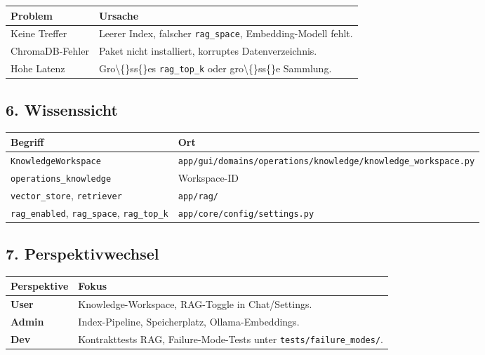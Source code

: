 \begin{center}
\begin{tabular}{ll}
\hline
Problem & Ursache \\
\hline
Keine Treffer & Leerer Index, falscher \texttt{rag\_space}, Embedding-Modell fehlt. \\
ChromaDB-Fehler & Paket nicht installiert, korruptes Datenverzeichnis. \\
Hohe Latenz & Gro\textbackslash\{\}ss\{\}es \texttt{rag\_top\_k} oder gro\textbackslash\{\}ss\{\}e Sammlung. \\
\hline
\end{tabular}
\end{center}

\subsection{6. Wissenssicht}

\begin{center}
\begin{tabular}{ll}
\hline
Begriff & Ort \\
\hline
\texttt{KnowledgeWorkspace} & \texttt{app/gui/domains/operations/knowledge/knowledge\_workspace.py} \\
\texttt{operations\_knowledge} & Workspace-ID \\
\texttt{vector\_store}, \texttt{retriever} & \texttt{app/rag/} \\
\texttt{rag\_enabled}, \texttt{rag\_space}, \texttt{rag\_top\_k} & \texttt{app/core/config/settings.py} \\
\hline
\end{tabular}
\end{center}

\subsection{7. Perspektivwechsel}

\begin{center}
\begin{tabular}{ll}
\hline
Perspektive & Fokus \\
\hline
\textbf{User} & Knowledge-Workspace, RAG-Toggle in Chat/Settings. \\
\textbf{Admin} & Index-Pipeline, Speicherplatz, Ollama-Embeddings. \\
\textbf{Dev} & Kontrakttests RAG, Failure-Mode-Tests unter \texttt{tests/failure\_modes/}. \\
\hline
\end{tabular}
\end{center}
